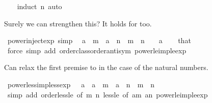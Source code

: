 \begin{isabellebody}
%
\isadelimproof
\ \ %
\endisadelimproof
%
\isatagproof
{}\isamarkupfalse%
\ {\isacharparenleft}{\kern0pt}induct\ n{\isacharparenright}{\kern0pt}\ auto%
\endisatagproof
{\isafoldproof}%
%
\isadelimproof
%
\endisadelimproof
%
\begin{isamarkuptext}%
Surely we can strengthen this? It holds for  too.%
\end{isamarkuptext}\isamarkuptrue%
\isamarkupfalse%
\ power{\isacharunderscore}{\kern0pt}inject{\isacharunderscore}{\kern0pt}exp\ {\isacharbrackleft}{\kern0pt}simp{\isacharbrackright}{\kern0pt}{\isacharcolon}{\kern0pt}\isanewline
\ \ {\isacartoucheopen}a\ {\isacharcircum}{\kern0pt}\ m\ {\isacharequal}{\kern0pt}\ a\ {\isacharcircum}{\kern0pt}\ n\ {\isasymlongleftrightarrow}\ m\ {\isacharequal}{\kern0pt}\ n{\isacartoucheclose}\ \ {\isacartoucheopen}{}\ {\isacharless}{\kern0pt}\ a{\isacartoucheclose}\isanewline
%
\isadelimproof
\ \ %
\endisadelimproof
%
\isatagproof
{}\isamarkupfalse%
\ that\ \isamarkupfalse%
\ {\isacharparenleft}{\kern0pt}force\ simp\ add{\isacharcolon}{\kern0pt}\ order{\isacharunderscore}{\kern0pt}class{\isachardot}{\kern0pt}order{\isachardot}{\kern0pt}antisym\ power{\isacharunderscore}{\kern0pt}le{\isacharunderscore}{\kern0pt}imp{\isacharunderscore}{\kern0pt}le{\isacharunderscore}{\kern0pt}exp{\isacharparenright}{\kern0pt}%
\endisatagproof
{\isafoldproof}%
%
\isadelimproof
%
\endisadelimproof
%
\begin{isamarkuptext}%
Can relax the first premise to  in the case of the
  natural numbers.%
\end{isamarkuptext}\isamarkuptrue%
\isamarkupfalse%
\ power{\isacharunderscore}{\kern0pt}less{\isacharunderscore}{\kern0pt}imp{\isacharunderscore}{\kern0pt}less{\isacharunderscore}{\kern0pt}exp{\isacharcolon}{\kern0pt}\ {\isachardoublequoteopen}{}\ {\isacharless}{\kern0pt}\ a\ {\isasymLongrightarrow}\ a\ {\isacharcircum}{\kern0pt}\ m\ {\isacharless}{\kern0pt}\ a\ {\isacharcircum}{\kern0pt}\ n\ {\isasymLongrightarrow}\ m\ {\isacharless}{\kern0pt}\ n{\isachardoublequoteclose}\isanewline
%
\isadelimproof
\ \ %
\endisadelimproof
%
\isatagproof
{}\isamarkupfalse%
\ {\isacharparenleft}{\kern0pt}simp\ add{\isacharcolon}{\kern0pt}\ order{\isacharunderscore}{\kern0pt}less{\isacharunderscore}{\kern0pt}le\ {\isacharbrackleft}{\kern0pt}of\ m\ n{\isacharbrackright}{\kern0pt}\ less{\isacharunderscore}{\kern0pt}le\ {\isacharbrackleft}{\kern0pt}of\ {\isachardoublequoteopen}a{\isacharcircum}{\kern0pt}m{\isachardoublequoteclose}\ {\isachardoublequoteopen}a{\isacharcircum}{\kern0pt}n{\isachardoublequoteclose}{\isacharbrackright}{\kern0pt}\ power{\isacharunderscore}{\kern0pt}le{\isacharunderscore}{\kern0pt}imp{\isacharunderscore}{\kern0pt}le{\isacharunderscore}{\kern0pt}exp{\isacharparenright}{\kern0pt}%

\end{isabellebody}
